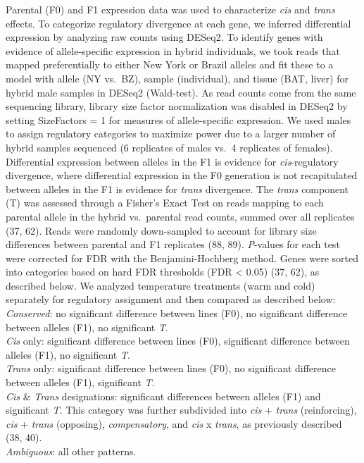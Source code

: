 \documentclass[9pt,twocolumn,twoside,lineno]{pnas-new}
\begin{document}
Parental (F0) and F1 expression data was used to characterize \emph{cis}
and \emph{trans} effects. To categorize regulatory divergence at each
gene, we inferred differential expression by analyzing raw counts using
DESeq2. To identify genes with evidence of allele-specific expression in
hybrid individuals, we took reads that mapped preferentially to either
New York or Brazil alleles and fit these to a model with allele (NY
vs.~BZ), sample (individual), and tissue (BAT, liver) for hybrid male
samples in DESeq2 (Wald-test). As read counts come from the same
sequencing library, library size factor normalization was disabled in
DESeq2 by setting SizeFactors = 1 for measures of allele-specific
expression. We used males to assign regulatory categories to maximize
power due to a larger number of hybrid samples sequenced (6 replicates
of males vs.~4 replicates of females). Differential expression between
alleles in the F1 is evidence for \emph{cis}-regulatory divergence,
where differential expression in the F0 generation is not recapitulated
between alleles in the F1 is evidence for \emph{trans} divergence. The
\emph{trans} component (T) was assessed through a Fisher's Exact Test on
reads mapping to each parental allele in the hybrid vs.~parental read
counts, summed over all replicates (37, 62). Reads were randomly
down-sampled to account for library size differences between parental
and F1 replicates (88, 89). \emph{P}-values for each test were corrected
for FDR with the Benjamini-Hochberg method. Genes were sorted into
categories based on hard FDR thresholds (FDR \textless{} 0.05) (37, 62),
as described below. We analyzed temperature treatments (warm and cold)
separately for regulatory assignment and then compared as described
below:\\
\indent \textit{Conserved}: no significant difference between lines
(F0), no significant difference between alleles (F1), no significant
\textit{T}.\\
\indent \textit{Cis} only: significant difference between lines (F0),
significant difference between alleles (F1), no significant
\textit{T}.\\
\indent \textit{Trans} only: significant difference between lines (F0),
no significant difference between alleles (F1), significant
\textit{T}.\\
\indent \emph{Cis} {\&} \emph{Trans} designations: significant
differences between alleles (F1) and significant \textit{T}. This
category was further subdivided into \emph{cis} + \emph{trans}
(reinforcing), \emph{cis} + \emph{trans} (opposing),
\textit{compensatory}, and \emph{cis} x \emph{trans}, as previously
described (38, 40).\\
\indent \emph{Ambiguous}: all other patterns.
\end{document}
